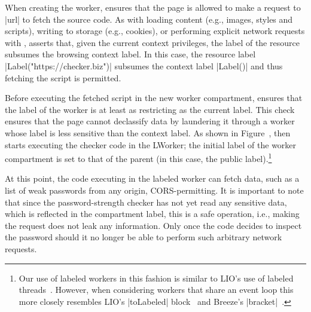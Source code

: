 When creating the worker, \sys{} ensures that the page is allowed to
make a request to \js|url| to fetch the source code.
%
As with loading content (e.g., images, styles and scripts), writing to
storage (e.g., cookies), or performing explicit network requests with
\xhr{}, \sys{} asserts that, given the current context privileges, the
label of the resource subsumes the browsing context label.
%
In this case, the resource label \js|Label("https://checker.biz")|
subsumes the context label \js|Label()| and thus fetching the script
is permitted.

Before executing the fetched script in the new worker compartment, \sys{}
ensures that the label of the worker is at least as restricting as the
current label.
%
This check ensures that the page cannot declassify data by laundering
it through a worker whose label is less sensitive than the context
label.
%
\iffigures
\ifcompletefigures
As shown in Figure~, 
\fi
\fi
\sys{} then starts
executing the checker code in the LWorker; the initial label of the
worker compartment is set to that of the parent (in this case, the
public label).\footnote{
%
Our use of labeled workers in this fashion is similar to LIO's
use of labeled threads~\cite{stefan:addressing-covert}.
%
However, when considering workers that share an event loop this more
closely resembles LIO's \js|toLabeled|
block~\cite{stefan:2011:flexible} and Breeze's
\js|bracket|~\cite{Breeze13}.
}
 
At this point, the code executing in the labeled worker can fetch
data, such as a list of weak passwords from any origin,
CORS-permitting.
%
It is important to note that since the password-strength checker has
not yet read any sensitive data, which is reflected in the compartment
label, this is a safe operation, i.e., making the request does not
leak any information.
%
Only once the code decides to inspect the password should it no
longer be able to perform such arbitrary network requests.

